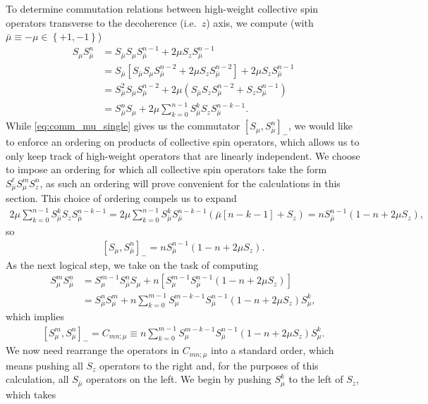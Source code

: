 \documentclass[aps,notitlepage,nofootinbib,11pt]{revtex4-1}
\newcommand{\p}[1]{\left(#1\right)} %
\renewcommand{\sp}[1]{\left[#1\right]} %
\renewcommand{\set}[1]{\left\{#1\right\}} %
\newcommand{\bmu}{{\bar\mu}}
\newcommand{\1}{\mathds{1}}
\begin{document}
To determine commutation relations between high-weight collective spin
operators transverse to the decoherence (i.e.~$z$) axis, we compute
(with $\bmu\equiv-\mu\in\set{+1,-1}$)
\begin{align}
  S_\mu S_\bmu^n
  &= S_\bmu S_\mu S_\bmu^{n-1} + 2\mu S_z S_\bmu^{n-1} \\
  &= S_\bmu \sp{S_\bmu S_\mu S_\bmu^{n-2} + 2\mu S_z S_\bmu^{n-2}}
  + 2\mu S_z S_\bmu^{n-1} \\
  &= S_\bmu^2 S_\mu S_\bmu^{n-2}
  + 2\mu \p{S_\bmu S_z S_\bmu ^{n-2} + S_z S_\bmu^{n-1}} \\
  &= S_\bmu^n S_\mu + 2\mu \sum_{k=0}^{n-1} S_\bmu^k S_z S_\bmu^{n-k-1}.
  \label{eq:comm_mu_single}
\end{align}
While \eqref{eq:comm_mu_single} gives us the commutator
$\sp{S_\mu,S_\bmu^n}_-$, we would like to enforce an ordering on
products of collective spin operators, which allows us to only keep
track of high-weight operators that are linearly independent.  We
choose to impose an ordering for which all collective spin operators
take the form $S_\bmu^\ell S_\mu^m S_z^n$, as such an ordering will
prove convenient for the calculations in this section.  This choice of
ordering compels us to expand
\begin{align}
  2 \mu \sum_{k=0}^{n-1} S_\bmu^k S_z S_\bmu^{n-k-1}
  = 2 \mu \sum_{k=0}^{n-1}
  S_\bmu^k S_\bmu^{n-k-1} \p{\bmu\sp{n-k-1} + S_z}
  = n S_\bmu^{n-1}\p{1 - n + 2\mu S_z},
\end{align}
so
\begin{align}
  \sp{S_\mu, S_\bmu^n}_-
  = n S_\bmu^{n-1}\p{1 - n + 2\mu S_z}.
\end{align}
As the next logical step, we take on the task of computing
\begin{align}
  S_\mu^m S_\bmu^n
  &= S_\mu^{m-1} S_\bmu^n S_\mu
  + n \sp{S_\mu^{m-1} S_\bmu^{n-1} \p{1 - n + 2\mu S_z}} \\
  &= S_\bmu^n S_\mu^m
  + n \sum_{k=0}^{m-1} S_\mu^{m-k-1} S_\bmu^{n-1}
  \p{1 - n + 2\mu S_z} S_\mu^k,
\end{align}
which implies
\begin{align}
  \sp{S_\mu^m, S_\bmu^n}_-
  = C_{mn;\mu}
  \equiv n \sum_{k=0}^{m-1} S_\mu^{m-k-1} S_\bmu^{n-1}
  \p{1 - n + 2\mu S_z} S_\mu^k.
\end{align}
We now need rearrange the operators in $C_{mn;\mu}$ into a standard
order, which means pushing all $S_z$ operators to the right and, for
the purposes of this calculation, all $S_\bmu$ operators on the left.
We begin by pushing $S_\mu^k$ to the left of $S_z$, which takes
\end{document}
